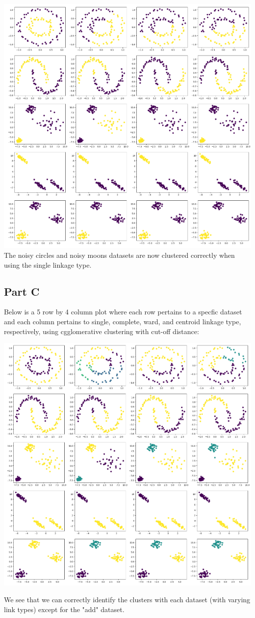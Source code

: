 \documentclass{article}
\begin{document}
\includegraphics{Images/Screenshot 2024-03-17 170543.png}
The noisy circles and noisy moons datasets are now clustered correctly when using the single linkage type.

\subsection*{Part C}
Below is a 5 row by 4 column plot where each row pertains to a specfic dataset and each column pertains to single, 
complete, ward, and centroid linkage type, respectively, using cgglomerative clustering with cut-off distance:

\includegraphics{Images/Screenshot 2024-03-17 170849.png}

We see that we can correctly identify the clusters with each dataset (with varying link types) except for the 
"add" dataset.
\end{document}
